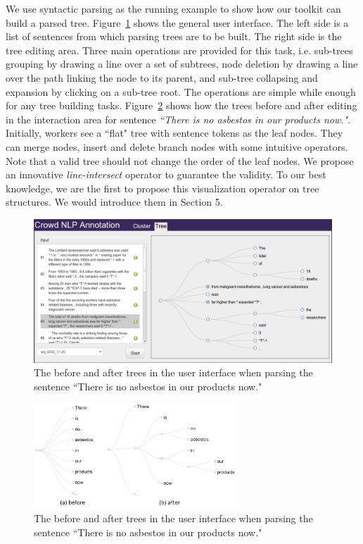 We use syntactic parsing as the running example to show how our
toolkit can build a parsed tree. Figure~\ref{fig:interface_tree.png}
shows the general user interface. The left side is a list of sentences
from which parsing trees are to be built. The right side is the
tree editing area. Three main operations are provided for this task,
i.e. sub-trees grouping by drawing a line over a set of subtrees, node
deletion by drawing a line over the path linking the node to its
parent, and sub-tree collapsing and expansion by clicking on a
sub-tree root. The operations are simple while enough for any tree
building tasks. Figure~\ref{fig:interface2.png} shows how the
trees before and after editing in the interaction area for sentence
{\em ``There is no asbestos in our products now."}. Initially, workers
see a ``flat" tree with sentence tokens as the leaf nodes. They can
merge nodes, insert and delete branch nodes with some intuitive
operators. Note that a valid tree should not change the order of the
leaf nodes. We propose an innovative {\em line-intersect} operator to
guarantee the validity. To our best knowledge, we are the first to
propose this visualization operator on tree structures. We would
introduce them in Section 5.

\begin{figure}
\centering
\includegraphics[width=6.1in]{figs/interface-tree.png}
\caption{The before and after trees in the user interface when parsing
the sentence {``There is no asbestos in our products now."}}
\label{fig:interface_tree.png}
\end{figure}



\begin{figure}
\centering
\includegraphics[width=3in]{figs/overview_tree_editing.png}
\caption{The before and after trees in the user interface when parsing
the sentence {``There is no asbestos in our products now."}}
\label{fig:interface2.png}
\end{figure}

